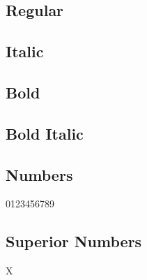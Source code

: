 \documentclass{article}
\begin{document}
\subsection*{Regular}
\lipsum[1]  

\subsection*{Italic}
\textit{\lipsum[2]}

\subsection*{Bold}

\textbf{\lipsum[3]}

\subsection*{Bold Italic}

\textbf{\textit{\lipsum[4]}}

\subsection*{Numbers}

0123456789

\subsection*{Superior Numbers}

X
\end{document}
